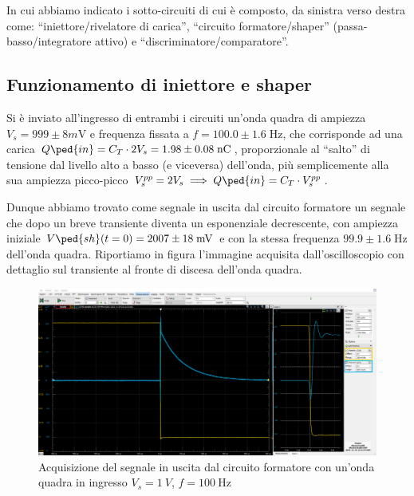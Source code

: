\documentclass[10pt, a4paper, italian]{article}
\begin{document}
In cui abbiamo indicato i sotto-circuiti di cui è composto, da sinistra verso
destra come: ``iniettore/rivelatore di carica'', ``circuito formatore/shaper''
(passa-basso/integratore attivo) e ``discriminatore/comparatore''.

\subsection{Funzionamento di iniettore e shaper}
Si è inviato all'ingresso di entrambi i circuiti un'onda quadra di
ampiezza $V_s = 999 \pm 8 \si{m\V}$ e frequenza fissata a
$f = 100.0 \pm 1.6 \; \si{\Hz}$, che corrisponde ad una carica
$Q\ped{in} = C_T \cdot 2V_s = 1.98 \pm 0.08 \; \si{n\coulomb}$, proporzionale
al ``salto'' di tensione dal livello alto a basso (e viceversa) dell'onda,
più semplicemente alla sua ampiezza picco-picco
$V_s^{pp} = 2 V_s \implies Q\ped{in} = C_T \cdot V_s^{pp}$.

Dunque abbiamo trovato come segnale in uscita dal circuito formatore un
segnale che dopo un breve transiente diventa un esponenziale decrescente,
con ampiezza iniziale $V\ped{sh} (t=0) = 2007 \pm 18 \; \si{m\V}$ e
con la stessa frequenza $99.9 \pm 1.6 \; \si{\Hz}$ dell'onda quadra.
Riportiamo in figura l'immagine acquisita dall'oscilloscopio con dettaglio
sul transiente al fronte di discesa dell'onda quadra.
\begin{figure}[htbp]
    \centering
	\includegraphics[scale=0.335]{shaperzoom}
    \caption{Acquisizione del segnale in uscita dal circuito formatore con
    un'onda quadra in ingresso $V_s = \SI{1}{V}$, $f = \SI{100}{\Hz}$
    \label{fig: shzoom}}
\end{figure}
\end{document}
